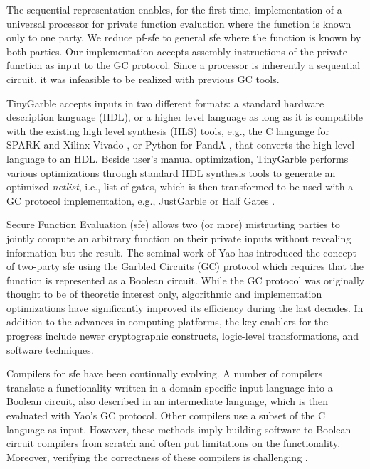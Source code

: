 The sequential representation enables, for the first time, implementation of a universal processor for private function evaluation where the function is known only to one party.
We reduce \acrfull{pf-sfe} to general \acrshort{sfe} where the function is known by both parties.
Our implementation accepts assembly instructions of the private function as input to the GC protocol.
Since a processor is inherently a sequential circuit, it was infeasible to be realized with previous GC tools.

TinyGarble accepts inputs in two different formats: a standard hardware description language (HDL), or a higher level language as long as it is compatible with the existing high level synthesis (HLS) tools, e.g., the C language for  SPARK \cite{Gupta2004} and Xilinx Vivado \cite{tool:Vivado}, or Python for PandA \cite{tool:PandA}, that converts the high level language to an HDL.
Beside user's manual optimization, TinyGarble performs various optimizations through standard HDL synthesis tools to generate an optimized \emph{netlist}, i.e., list of gates, which is then transformed to be used with a GC protocol implementation, e.g., JustGarble \cite{bellare2013efficient} or Half Gates \cite{zahur2015two}.


Secure Function Evaluation (\acrshort{sfe}) allows two (or more) mistrusting parties to jointly compute an arbitrary function on their private inputs without revealing information but the result. The seminal work of Yao \cite{yao1986generate} has introduced the concept of two-party \acrshort{sfe} using the Garbled Circuits (GC) protocol which requires that the function is represented as a Boolean circuit. While the GC protocol was originally thought to be of theoretic interest only, algorithmic and implementation optimizations have significantly improved its efficiency during the last decades. In addition to the advances in computing platforms, the key enablers for the progress include newer cryptographic constructs, logic-level transformations, and software techniques.

Compilers for \acrshort{sfe} have been continually evolving. A number of compilers~\cite{malkhi2004fairplay,ben2008fairplaymp,henecka2010tasty,kreuter2012billion} translate a functionality written in a domain-specific input language into a Boolean circuit, also described in an intermediate language, which is then evaluated with Yao's GC protocol. Other compilers \cite{franz2014cbmc,kreuter2013pcf} use a subset of the C language as input. However, these methods imply building software-to-Boolean circuit compilers from scratch and often put limitations on the functionality. Moreover, verifying the correctness of these compilers is challenging \cite{mood2016frigate}.

